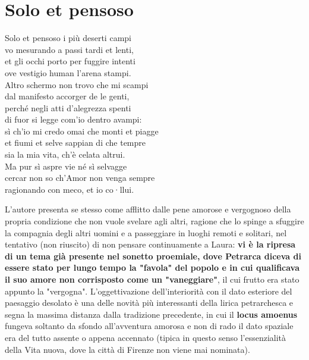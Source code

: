 \documentclass[10pt,a4paper]{article}
\begin{document}
\section{Solo et pensoso}
\label{sec:Solo et pensoso}

\begin{estratto}
	Solo et pensoso i più deserti campi\\
	vo mesurando a passi tardi et lenti,\\
	et gli occhi porto per fuggire intenti\\
	ove vestigio human l’arena stampi.\\
	
	Altro schermo non trovo che mi scampi\\
	dal manifesto accorger de le genti,\\
	perché negli atti d’alegrezza spenti\\
	di fuor si legge com’io dentro avampi:\\
	
	sì ch’io mi credo omai che monti et piagge\\
	et fiumi et selve sappian di che tempre\\
	sia la mia vita, ch’è celata altrui.\\
	
	Ma pur sì aspre vie né sì selvagge\\
	cercar non so ch’Amor non venga sempre\\
	ragionando con meco, et io co·llui.\\
\end{estratto}

L'autore presenta se stesso come afflitto dalle pene amorose e vergognoso della propria condizione che non vuole svelare agli altri, ragione che lo spinge a sfuggire la compagnia degli altri uomini e a passeggiare in luoghi remoti e solitari, nel tentativo (non riuscito) di non pensare continuamente a Laura: \textbf{vi è la ripresa di un tema già presente nel sonetto proemiale, dove Petrarca diceva di essere stato per lungo tempo la "favola" del popolo e in cui qualificava il suo amore non corrisposto come un "vaneggiare"}, il cui frutto era stato appunto la "vergogna". L'oggettivazione dell'interiorità con il dato esteriore del paesaggio desolato è una delle novità più interessanti della lirica petrarchesca e segna la massima distanza dalla tradizione precedente, in cui il \textbf{locus amoenus} fungeva soltanto da sfondo all'avventura amorosa e non di rado il dato spaziale era del tutto assente o appena accennato (tipica in questo senso l'essenzialità della Vita nuova, dove la città di Firenze non viene mai nominata).
\end{document}
